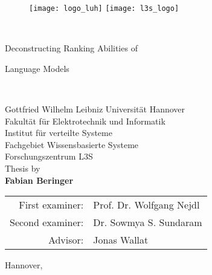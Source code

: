 \thispagestyle{empty}

{\sffamily
	\begin{figure}
		\texttt{[image: logo\_luh]}
		\hfill
		\texttt{[image: l3s\_logo]}
	\end{figure}
	\begin{center}
		\mbox{} \\
		\vspace{1.5cm}
		\huge{Deconstructing Ranking Abilities of

			Language Models}\\
		\vspace{1.8cm}
		{\large
			Gottfried Wilhelm Leibniz Universität Hannover\\
			Fakultät für Elektrotechnik und Informatik\\
			Institut für verteilte Systeme \\
			Fachgebiet Wissensbasierte Systeme \\
			Forschungszentrum L3S \\
			\vspace{1.8cm}
			Thesis by \\
			\textbf{Fabian Beringer} \\
			\vspace{1.8cm}
			\begin{tabular}{rl}
				First examiner:  & Prof. Dr. Wolfgang Nejdl \\
				Second examiner: & Dr. Sowmya S. Sundaram   \\
				Advisor:         & Jonas Wallat             \\
			\end{tabular}
			\vfill
			Hannover, \handindate
		}
	\end{center}
}
\newpage